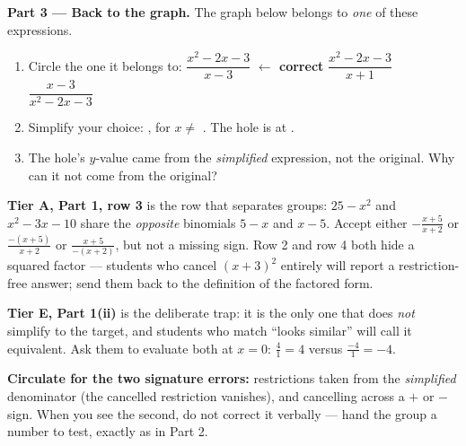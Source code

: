 \documentclass[10pt]{article}
\newcommand{\lgrid}[4]{%
  \draw[step=1, linegray!40, very thin] (#1,#3) grid (#2,#4);
  \draw[->, semithick, charcoal] (#1,0)--(#2,0) node[below right, font=\scriptsize]{$x$};
  \draw[->, semithick, charcoal] (0,#3)--(0,#4) node[left, font=\scriptsize]{$y$};}
\begin{document}
\begin{tcolorbox}[colback=white, colframe=black!40, title=\textbf{Tier E --- Extension},
    fonttitle=\bfseries, arc=1.5mm, left=3mm, right=3mm, top=2mm, bottom=2mm, breakable]
\vspace{5pt}
\textbf{Part 3 --- Back to the graph.} The graph below belongs to \emph{one} of these expressions.
\begin{center}
\end{center}
\begin{enumerate}[label=(\alph*), leftmargin=1.9em, itemsep=6pt]
  \item Circle the one it belongs to: \quad
        $\dfrac{x^2-2x-3}{x-3}$ \; \textcolor{keyred}{\textbf{$\leftarrow$ correct}} \qquad
        $\dfrac{x^2-2x-3}{x+1}$ \qquad $\dfrac{x-3}{x^2-2x-3}$
  \item Simplify your choice: , \; for $x\neq$ . The hole is at
        .
  \item The hole's $y$-value came from the \emph{simplified} expression, not the original. Why can it
        not come from the original?
\end{enumerate}
\end{tcolorbox}

\begin{teachernote}
\textbf{Tier A, Part 1, row 3} is the row that separates groups: $25-x^2$ and $x^2-3x-10$ share the
\emph{opposite} binomials $5-x$ and $x-5$. Accept either $-\frac{x+5}{x+2}$ or $\frac{-(x+5)}{x+2}$ or
$\frac{x+5}{-(x+2)}$, but not a missing sign. Row 2 and row 4 both hide a squared factor --- students
who cancel $(x+3)^2$ entirely will report a restriction-free answer; send them back to the definition
of the factored form.

\vspace{3pt}
\textbf{Tier E, Part 1(ii)} is the deliberate trap: it is the only one that does \emph{not} simplify to
the target, and students who match ``looks similar'' will call it equivalent. Ask them to evaluate both
at $x=0$: $\frac{4}{1}=4$ versus $\frac{-4}{1}=-4$.

\vspace{3pt}
\textbf{Circulate for the two signature errors:} restrictions taken from the \emph{simplified}
denominator (the cancelled restriction vanishes), and cancelling across a $+$ or $-$ sign. When you see
the second, do not correct it verbally --- hand the group a number to test, exactly as in Part 2.
\end{teachernote}
\end{document}
